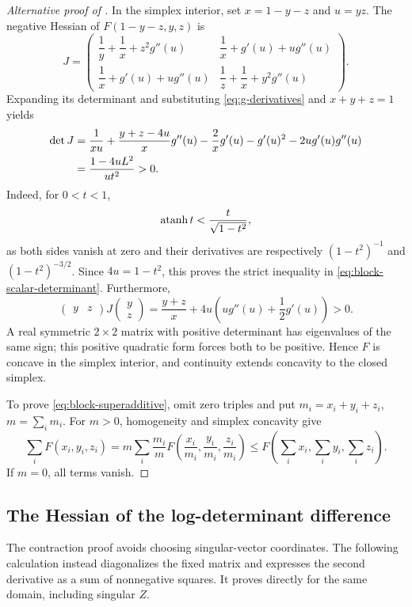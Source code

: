 \begin{proof}[Alternative proof of ]
In the simplex interior, set $x=1-y-z$ and $u=yz$.
The negative Hessian of $F(1-y-z,y,z)$ is
\[
 J=\begin{pmatrix}
 \dfrac1y+\dfrac1x+z^2g''(u)&\dfrac1x+g'(u)+ug''(u)\\[5pt]
 \dfrac1x+g'(u)+ug''(u)&\dfrac1z+\dfrac1x+y^2g''(u)
 \end{pmatrix}.
\]
Expanding its determinant and substituting \eqref{eq:g-derivatives}
and $x+y+z=1$ yields
\begin{align}
 \det J
 &=\frac1{xu}+\frac{y+z-4u}{x}g''(u)
   -\frac2xg'(u)-g'(u)^2-2ug'(u)g''(u)\notag\\
 &=\frac{1-4uL^2}{ut^2}>0.
 \label{eq:block-scalar-determinant}
\end{align}
Indeed, for $0<t<1$,
\[
 \operatorname{atanh} t<\frac{t}{\sqrt{1-t^2}},
\]
as both sides vanish at zero and their derivatives are respectively
$(1-t^2)^{-1}$ and $(1-t^2)^{-3/2}$. Since $4u=1-t^2$, this proves
the strict inequality in \eqref{eq:block-scalar-determinant}.
Furthermore,
\[
 \begin{pmatrix}y&z\end{pmatrix}J\begin{pmatrix}y\\z\end{pmatrix}
 =\frac{y+z}{x}
   +4u\left(ug''(u)+\frac12g'(u)\right)>0.
\]
A real symmetric $2\times2$ matrix with positive determinant has
eigenvalues of the same sign; this positive quadratic form forces
both to be positive. Hence $F$ is concave in the simplex interior,
and continuity extends concavity to the closed simplex.

To prove \eqref{eq:block-superadditive}, omit zero triples and put
$m_i=x_i+y_i+z_i$, $m=\sum_i m_i$. For $m>0$, homogeneity and
simplex concavity give
\[
 \sum_i F(x_i,y_i,z_i)
 =m\sum_i\frac{m_i}{m}
      F\!\left(\frac{x_i}{m_i},\frac{y_i}{m_i},\frac{z_i}{m_i}\right)
 \le F\!\left(\sum_i x_i,\sum_i y_i,\sum_i z_i\right).
\]
If $m=0$, all terms vanish.

\end{proof}

\subsection{The Hessian of the log-determinant difference}

The contraction proof avoids choosing singular-vector coordinates.
The following calculation instead diagonalizes the fixed matrix and
expresses the second derivative as a sum of nonnegative squares.
It proves  directly for the same domain, including
singular $Z$.

